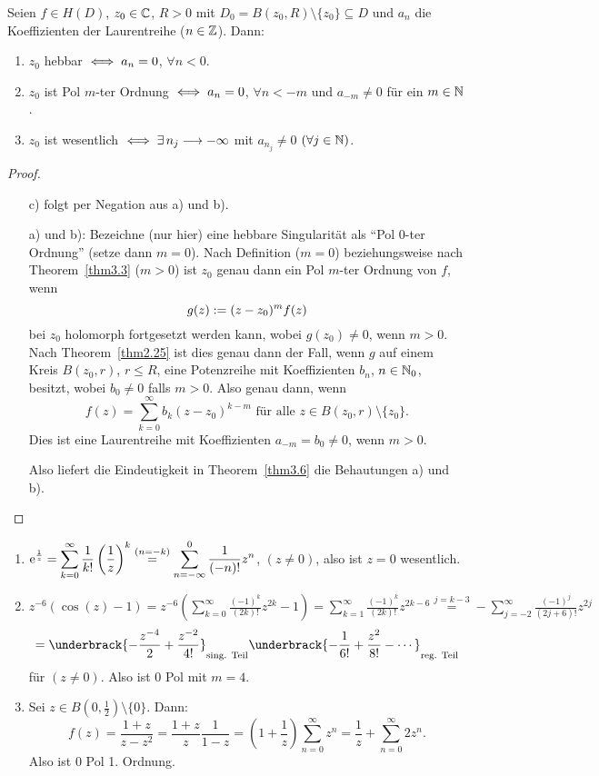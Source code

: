 \documentclass[a4paper,twoside,DIV15,BCOR12mm]{scrbook}
\begin{document}
\begin{kor}\label{kor3.7}
Seien $f\in H(D)$, $z_0\in\mathbb{C}$, $R>0$ mit $D_0=B(z_0,R)\setminus\{z_0\}\subseteq D$ und $a_n$ die Koeffizienten der Laurentreihe ($n\in\mathbb{Z}$). Dann:
\begin{enumerate}
\item $z_0$ hebbar $\iff a_n=0$, $\forall n<0$.
\item $z_0$ ist Pol $m$-ter Ordnung $\iff a_n=0$, $\forall n<-m$ und $a_{-m}\neq 0$ für ein $m\in\mathbb{N}$.
\item $z_0$ ist wesentlich $\iff\exists\,n_j\longrightarrow -\infty$ mit $a_{n_j}\neq 0$ $(\forall j\in\mathbb{N})$.
\end{enumerate}
\end{kor}

\begin{proof}\begin{itemize}
\item [c)] folgt per Negation aus a) und b).
\item [a)] und b): Bezeichne (nur hier) eine hebbare Singularität als "`Pol 0-ter Ordnung"' (setze dann $m=0$). Nach Definition ($m=0$) beziehungsweise nach Theorem~\ref{thm3.3} ($m>0$) ist $z_0$ genau dann ein Pol $m$-ter Ordnung von $f$, wenn
\[g(z):= (z-z_0)^mf(z)\]
bei $z_0$ holomorph fortgesetzt werden kann, wobei $g(z_0)\neq 0$, wenn $m>0$. Nach Theorem~\ref{thm2.25} ist dies genau dann der Fall, wenn $g$ auf einem Kreis $B(z_0,r)$, $r\leq R$, eine Potenzreihe mit Koeffizienten $b_n$, $n\in\mathbb{N}_0$, besitzt, wobei $b_0\neq 0$ falls $m>0$. Also genau dann, wenn
\[f(z)=\sum_{k=0}^{\infty}b_k(z-z_0)^{k-m}\text{ für alle }z\in B(z_0,r)\setminus\{z_0\}.\]
Dies ist eine Laurentreihe mit Koeffizienten $a_{-m}=b_0\neq 0$, wenn $m>0$.

Also liefert die Eindeutigkeit in Theorem~\ref{thm3.6} die Behautungen a) und b).\qedhere
\end{itemize}
\end{proof}

\begin{bsp}\label{bsp3.8}\begin{enumerate}
\item $\displaystyle\mathrm{e}^{\frac{1}{z}}=\sum_{k=0}^{\infty}\frac{1}{k!}\left(\frac{1}{z}\right)^k \overset{(n=-k)}{=}\sum_{n=-\infty}^{0}\frac{1}{(-n)!}z^n$, $(z\neq 0)$, also ist $z=0$ wesentlich.
\item $\displaystyle z^{-6}(\cos(z)-1)=z^{-6}\left(\sum_{k=0}^{\infty}\frac{(-1)^k}{(2k)!}z^{2k}-1\right) = \sum_{k=1}^{\infty}\frac{(-1)^k}{(2k)!}z^{2k-6}\overset{j=k-3}{=}-\sum_{j=-2}^{\infty}\frac{(-1)^j}{(2j+6)!}z^{2j}$
\[=\underbrack{-\frac{z^{-4}}{2}+\frac{z^{-2}}{4!}}_{\text{sing. Teil}}\underbrack{-\frac{1}{6!}+\frac{z^2}{8!}-\dotsb}_{\text{reg. Teil}}\]
für $(z\neq 0)$. Also ist 0 Pol mit $m=4$.
\item Sei $z\in B(0,\frac{1}{2})\setminus\{0\}$. Dann:
\[f(z)=\frac{1+z}{z-z^2} = \frac{1+z}{z}\frac{1}{1-z}=\left(1+\frac{1}{z}\right)\sum_{n=0}^{\infty}z^n=\frac{1}{z}+\sum_{n=0}^{\infty}2z^n.\]
Also ist 0 Pol 1. Ordnung.
\end{enumerate}\end{bsp}
\end{document}
